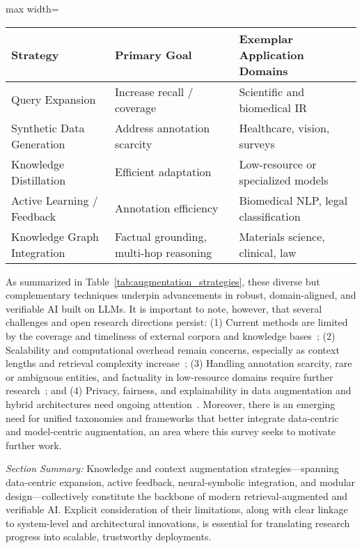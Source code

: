 \documentclass[sigconf]{acmart}
\begin{document}
\begin{table*}[htbp]
\centering
\caption{Representative Knowledge and Context Augmentation Strategies}
\label{tab:augmentation_strategies}
\begin{adjustbox}{max width=\textwidth}
\begin{tabular}{lll}
\toprule
\textbf{Strategy} & \textbf{Primary Goal} & \textbf{Exemplar Application Domains} \\
\midrule
Query Expansion         & Increase recall / coverage   & Scientific and biomedical IR \\
Synthetic Data Generation & Address annotation scarcity & Healthcare, vision, surveys \\
Knowledge Distillation  & Efficient adaptation        & Low-resource or specialized models \\
Active Learning / Feedback & Annotation efficiency        & Biomedical NLP, legal classification \\
Knowledge Graph Integration & Factual grounding, multi-hop reasoning & Materials science, clinical, law \\
\bottomrule
\end{tabular}
\end{adjustbox}
\end{table*}

As summarized in Table~\ref{tab:augmentation_strategies}, these diverse but complementary techniques underpin advancements in robust, domain-aligned, and verifiable AI built on LLMs. It is important to note, however, that several challenges and open research directions persist: (1) Current methods are limited by the coverage and timeliness of external corpora and knowledge bases~\cite{ref48, ref54}; (2) Scalability and computational overhead remain concerns, especially as context lengths and retrieval complexity increase~\cite{ref49, ref43}; (3) Handling annotation scarcity, rare or ambiguous entities, and factuality in low-resource domains require further research~\cite{ref31, ref61, ref62}; and (4) Privacy, fairness, and explainability in data augmentation and hybrid architectures need ongoing attention~\cite{ref32, ref33, ref48, ref54}. Moreover, there is an emerging need for unified taxonomies and frameworks that better integrate data-centric and model-centric augmentation, an area where this survey seeks to motivate further work.

\textit{Section Summary:} Knowledge and context augmentation strategies—spanning data-centric expansion, active feedback, neural-symbolic integration, and modular design—collectively constitute the backbone of modern retrieval-augmented and verifiable AI. Explicit consideration of their limitations, along with clear linkage to system-level and architectural innovations, is essential for translating research progress into scalable, trustworthy deployments.
\end{document}
